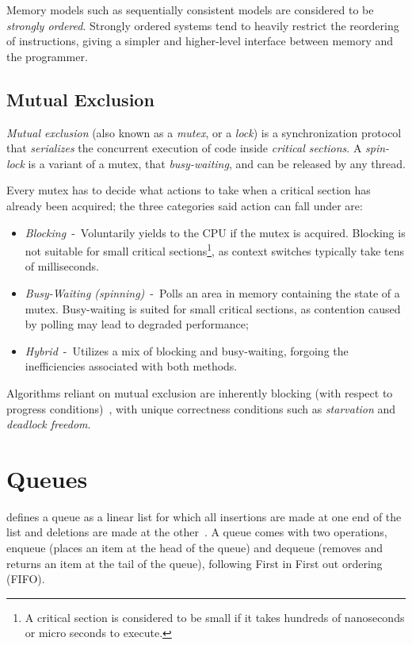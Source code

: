 Memory models such as sequentially consistent models are considered to be
\emph{strongly ordered}. Strongly ordered systems tend to
heavily restrict the reordering of instructions, giving a simpler and
higher-level interface between memory and the programmer. 

\subsection{Mutual Exclusion}
\emph{Mutual exclusion} (also known as a \emph{mutex}, or a \emph{lock}) is a synchronization protocol that \emph{serializes}
the concurrent execution of code inside \emph{critical sections}.
A \emph{spin-lock} is a variant of a mutex, that 
\emph{busy-waiting}, and can be released by any thread.

Every mutex has to decide what actions to take when a
critical section has already been acquired; the three categories said action
can fall under are: 

\begin{itemize}
\item \emph{Blocking}~-~Voluntarily yields to the CPU
if the mutex is acquired. Blocking is not suitable for small critical
sections\footnote{A critical section is considered to be small if it takes
hundreds of nanoseconds or micro seconds to execute.}, as context switches typically take tens of milliseconds.
\item \emph{Busy-Waiting (spinning)}~-~Polls an area in memory
containing the state of a mutex. Busy-waiting is suited for small
critical sections, as contention caused by polling may lead to degraded
performance;
\item \emph{Hybrid}~-~Utilizes a mix of blocking and busy-waiting, forgoing the
inefficiencies associated with both methods.
\end{itemize}

Algorithms reliant on mutual exclusion are inherently
blocking (with respect to progress conditions)~\citep[Section~3.8]{herlihy2020art}, with
unique correctness conditions such as \emph{starvation} and \emph{deadlock
freedom}.


\section{Queues}
\citeauthor{knuth1968art} defines a queue as a linear list for which all
insertions are made at one end of the list and deletions are made at the
other~\citep{knuth1968art}. A queue comes with two operations, enqueue (places
an item at the head of the queue) and dequeue (removes and returns an item at
the tail of the queue), following First in First out ordering (FIFO).


